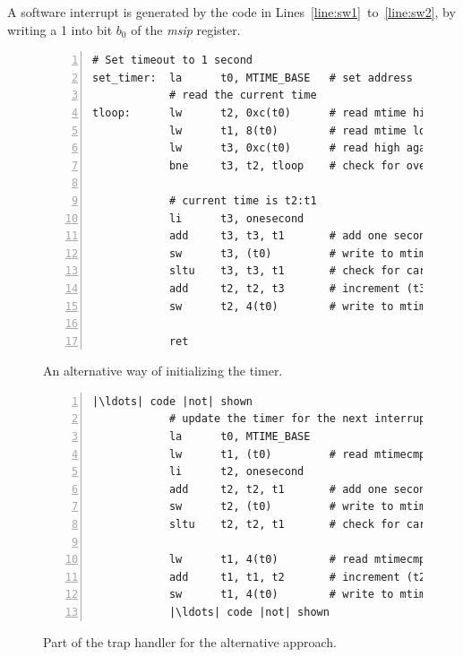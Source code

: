 \documentclass[11pt, twoside, pdftex]{article}
\begin{document}
A software interrupt is generated by the code in Lines~\ref{line:sw1}~to~\ref{line:sw2},
by writing a 1 into bit $b_0$ of the {\it msip} register.

\begin{figure}[H]
\begin{center}
\begin{minipage}[h]{16 cm}
\begin{lstlisting}[style=defaultNiosVStyle, name=vecs, numbers=left, escapechar=|]
# Set timeout to 1 second
set_timer:  la      t0, MTIME_BASE   # set address
            # read the current time
tloop:      lw      t2, 0xc(t0)      # read mtime high
            lw      t1, 8(t0)        # read mtime low
            lw      t3, 0xc(t0)      # read high again
            bne     t3, t2, tloop    # check for overflow from low to high
            
            # current time is t2:t1
            li      t3, onesecond
            add     t3, t3, t1       # add one second to current time
            sw      t3, (t0)         # write to mtimecmp low
            sltu    t3, t3, t1       # check for carry-out
            add     t2, t2, t3       # increment (t3 = carry-out)
            sw      t2, 4(t0)        # write to mtimecmp high

            ret
\end{lstlisting}
	\caption{An alternative way of initializing the timer.}
	\label{fig:set_timer}
\end{minipage}
\end{center}
\end{figure}

\begin{figure}[H]
\begin{center}
\begin{minipage}[h]{16 cm}
\begin{lstlisting}[style=defaultNiosVStyle, name=vecs, numbers=left, escapechar=|]
            |\ldots| code |not| shown
            # update the timer for the next interrupt cycle
            la      t0, MTIME_BASE
            lw      t1, (t0)         # read mtimecmp low
            li      t2, onesecond
            add     t2, t2, t1       # add one second to mtimecmp
            sw      t2, (t0)         # write to mtimecmp low
            sltu    t2, t2, t1       # check for carry-out from addition

            lw      t1, 4(t0)        # read mtimecmp high
            add     t1, t1, t2       # increment (t2 = carry-out)
            sw      t1, 4(t0)        # write to mtimecmp high
            |\ldots| code |not| shown
\end{lstlisting}
	\caption{Part of the trap handler for the alternative approach.}
	\label{fig:trap_mtimecmp}
\end{minipage}
\end{center}
\end{figure}
\end{document}
